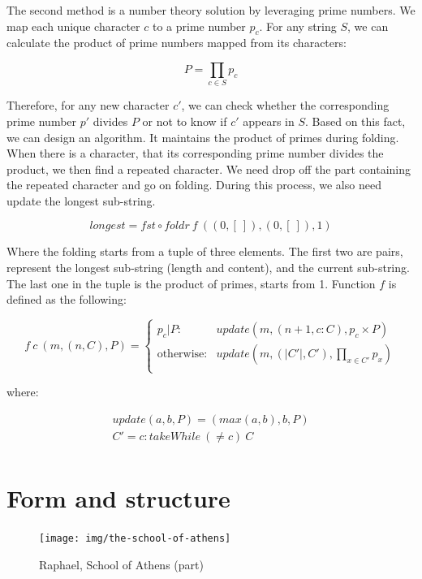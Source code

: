 \documentclass[b5paper]{article}
\begin{document}
\begin{Answer}[ref={ex:foldr}]
{The second method is a number theory solution by leveraging prime numbers. We map each unique character $c$ to a prime number $p_c$. For any string $S$, we can calculate the product of prime numbers mapped from its characters:

\[
P = \displaystyle \prod_{c \in S} p_c
\]

Therefore, for any new character $c'$, we can check whether the corresponding prime number $p'$ divides $P$ or not to know if $c'$ appears in $S$. Based on this fact, we can design an algorithm. It maintains the product of primes during folding. When there is a character, that its corresponding prime number divides the product, we then find a repeated character. We need drop off the part containing the repeated character and go on folding. During this process, we also need update the longest sub-string.

\[
longest = fst \circ foldr\ f\ ((0, [\ ]), (0, [\ ]), 1)
\]

Where the folding starts from a tuple of three elements. The first two are pairs, represent the longest sub-string (length and content), and the current sub-string. The last one in the tuple is the product of primes, starts from 1. Function $f$ is defined as the following:

\[
f\ c\ (m, (n, C), P) = \begin{cases}
  p_c | P : & update(m, (n + 1, c : C), p_c \times P) \\
  \text{otherwise}: & update(m, (|C'|, C'), \displaystyle \prod_{x \in C'} p_x) \\
\end{cases}
\]

where:

\[ \begin{array}{l}
update(a, b, P) = (max(a, b), b, P) \\
C' = c : takeWhile\ (\neq c)\ C \\
\end{array} \]
}
\end{Answer}

\section{Form and structure}

\begin{figure}[htbp]
 \centering
 \texttt{[image: img/the-school-of-athens]}
 \caption{Raphael, School of Athens (part)}
 \label{fig:the-school-of-athens}
\end{figure}
\end{document}
